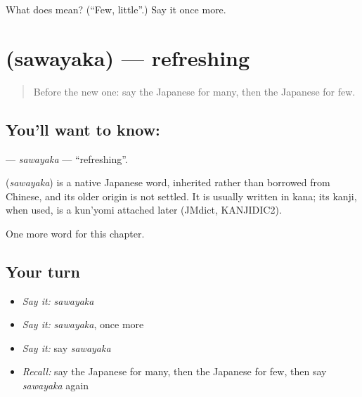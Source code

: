 \begin{tcolorbox}[breakable,colback=teal!4,colframe=teal!35!black,title={Before you move on}]
What does  mean? (\textquotedblleft{}Few, little\textquotedblright{}.) Say it once more.
\end{tcolorbox}
\section[\texorpdfstring{\ja{さわやか} (sawayaka)}{さわやか (sawayaka)}]{ (sawayaka) — refreshing}

\label{lesson:JA-C127-sawayaka}



\begin{quote}
Before the new one: say the Japanese for many, then the Japanese for few.
\end{quote}

\subsection*{You'll want to know: }
\textbf{} — \emph{sawayaka} — \textquotedblleft{}refreshing\textquotedblright{}.

\begin{cousinweb}
\textbf{} (\emph{sawayaka}) is a native Japanese word, inherited rather than borrowed from Chinese, and its older origin is not settled. It is usually written in kana; its kanji, when used, is a kun'yomi attached later (JMdict, KANJIDIC2).
\end{cousinweb}

\begin{grammarlens}[title={What you've built}]
One more word for this chapter.
\end{grammarlens}

\subsection*{Your turn}
\begin{itemize}
\raggedright
  \item \emph{Say it:} \emph{sawayaka}
  \item \emph{Say it:} \emph{sawayaka}, once more
  \item \emph{Say it:} say \emph{sawayaka}
  \item \emph{Recall:} say the Japanese for many, then the Japanese for few, then say \emph{sawayaka} again
\end{itemize}

